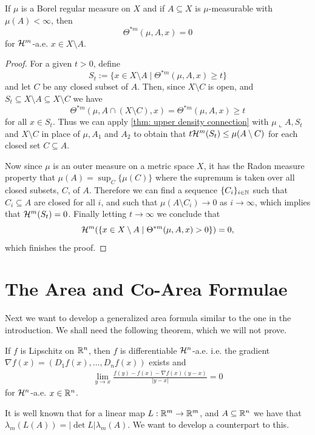 \begin{theorem}\label{thm: upper density theorem}
If $\mu$ is a Borel regular measure on $X$ and if $A \subseteq X$ is $\mu$-measurable with $\mu(A)<\infty$, then
\[
    \Theta^{*m}(\mu,A,x)=0
\]
for $\mathcal{H}^m$-a.e. $x \in X \setminus A$.
\end{theorem}
\begin{proof}
For a given $t > 0$, define
\[
    S_t:=\{x \in X \setminus A \mid \Theta^{*m}(\mu,A,x) \ge t \}
\]
and let $C$ be any closed subset of $A$. Then, since $X \setminus C$ is open, and $S_t \subseteq X \setminus A \subseteq X \setminus C$ we have
\[
    \Theta^{*m}(\mu,A\cap(X \setminus C),x) = \Theta^{*m}(\mu,A,x) \ge t
\]
for all $x \in S_t$. Thus we can apply \cref{thm: upper density connection} with $\mu \llcorner A, S_t$ and $X \setminus C$ in place of $\mu,A_1$ and $A_2$ to obtain that $t\mathcal{H}^m(S_t) \le \mu(A\setminus C)$ for each closed set $C \subseteq A$.

Now since $\mu$ is an outer measure on a metric space $X$, it has the Radon measure property that $\mu(A) = \sup_C\{\mu(C)\}$ where the supremum is taken over all closed subsets, $C$, of $A$. Therefore we can find a sequence $\{C_i\}_{i \in \mathbb{N}}$ such that $C_i \subseteq A$ are closed for all $i$, and such that $\mu(A \setminus C_i) \to 0$ as $i \to \infty$, which implies that $\mathcal{H}^m(S_t)=0$. Finally letting $t \to \infty$ we conclude that
\[
    \mathcal{H}^m(\{x \in X \setminus A \mid \Theta^{*m}(\mu,A,x)>0 \} ) = 0,
\]
which finishes the proof.
\end{proof}


\section{The Area and Co-Area Formulae}
Next we want to develop a generalized area formula similar to the one in the introduction. We shall need the following theorem, which we will not prove.
\begin{theorem}
If $f$ is Lipschitz on $\mathbb{R}^n$, then $f$ is differentiable $\mathcal{H}^n$-a.e. i.e. the gradient $\nabla f(x) = (D_1f(x), \dots, D_nf(x))$ exists and
\begin{align*}
    \lim_{y \to x} \frac{f(y) - f(x) - \nabla f(x)(y-x)}{|y-x|} = 0
\end{align*}
for $\mathcal{H}^n$-a.e. $x \in \mathbb{R}^n$.
\end{theorem}

It is well known that for a linear map $L: \mathbb{R}^m \to \mathbb{R}^m$, and $A \subseteq \mathbb{R}^n$ we have that $\lambda_m(L(A)) = |\det L| \lambda_m(A)$. We want to develop a counterpart to this.


